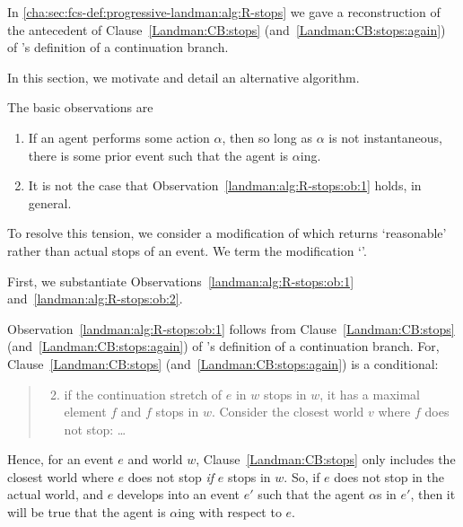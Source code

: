 \begin{note}
  In \autoref{cha:sec:fcs-def:progressive-landman:alg:R-stops} we gave a reconstruction of the antecedent of Clause~\ref{Landman:CB:stops} (and~\ref{Landman:CB:stops:again}) of \citeauthor{Landman:1992wh}'s definition of a continuation branch.

  In this section, we motivate and detail an alternative algorithm.

  The basic observations are
  \begin{enumerate}[label=\arabic*., ref=(\arabic*), noitemsep]
  \item
    \label{landman:alg:R-stops:ob:1}
    If an agent performs some action \(\alpha\), then so long as \(\alpha\) is not instantaneous, there is some prior event such that the agent is \(\alpha\)ing.
  \item
    \label{landman:alg:R-stops:ob:2}
    It is not the case that Observation~\ref{landman:alg:R-stops:ob:1} holds, in general.
  \end{enumerate}
  To resolve this tension, we consider a modification of \AlgGetStops{} which returns `reasonable' rather than actual stops of an event.
  We term the modification `\AlgGetPStops{}'.

  First, we substantiate Observations~\ref{landman:alg:R-stops:ob:1} and~\ref{landman:alg:R-stops:ob:2}.
\end{note}

\begin{note}
  Observation~\ref{landman:alg:R-stops:ob:1} follows from  Clause~\ref{Landman:CB:stops} (and~\ref{Landman:CB:stops:again}) of \citeauthor{Landman:1992wh}'s definition of a continuation branch.
  For, Clause~\ref{Landman:CB:stops} (and~\ref{Landman:CB:stops:again}) is a conditional:
  \begin{quote}
    \begin{enumerate}
      \setcounter{enumi}{1}
    \item
      if the continuation stretch of \(e\) in \(w\) stops in \(w\), it has a maximal element \(f\) and \(f\) stops in \(w\).
      Consider the closest world \(v\) where \(f\) does not stop: \dots
    \end{enumerate}
  \end{quote}
  Hence, for an event \(e\) and world \(w\), Clause~\ref{Landman:CB:stops} only includes the closest world where \(e\) does not stop \emph{if} \(e\) stops in \(w\).
  So, if \(e\) does not stop in the actual world, and \(e\) develops into an event \(e'\) such that the agent \(\alpha\)s in \(e'\), then it will be true that the agent is \(\alpha\)ing with respect to \(e\).
\end{note}

